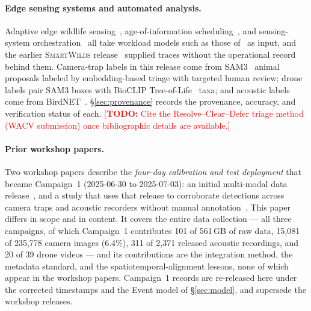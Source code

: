 \documentclass[sigconf]{acmart}
\newcommand{\smartwilds}{\textsc{SmartWilds}\xspace}
\newcommand{\TODO}[1]{\textcolor{red}{\footnotesize[\textbf{TODO:} #1]}}
\newcommand{\TODO}[1]{}
\begin{document}
\paragraph{Edge sensing systems and automated analysis.}
Adaptive edge wildlife
sensing~\cite{rastikerdar2026wildfit,Pestell2025SmartCamera},
age-of-information scheduling~\cite{huang2025ageofevent}, and
sensing-system orchestration~\cite{lin2025skyeye,liu2026eric} all take
workload models such as those of~\cite{kline2024characterizing,kline2026blueprint}
as input, and the earlier \smartwilds
release~\cite{kline2025smartwilds} supplied traces without the
operational record behind them. Camera-trap labels in this release come
from SAM3~\cite{carion2026sam} animal proposals labeled by
embedding-based triage with targeted human review; drone labels pair
SAM3 boxes with BioCLIP
Tree-of-Life~\cite{stevens2024bioclip,gu2025bioclip,treeoflife_200m}
taxa; and acoustic labels come from
BirdNET~\cite{kahl2021birdnet,Besson2022Automated}.
\S\ref{sec:provenance} records the provenance, accuracy, and
verification status of each.
\TODO{Cite the Resolve--Clear--Defer triage method (WACV submission)
once bibliographic details are available.}

\paragraph{Prior workshop papers.}
Two workshop papers describe the \emph{four-day calibration and test
deployment} that became Campaign~1 (2025-06-30 to 2025-07-03): an
initial multi-modal data release~\cite{kline2025smartwilds}, and a
study that uses that release to corroborate detections across camera
traps and acoustic recorders without manual
annotation~\cite{pillai2026cross}.
This paper differs in scope and in content. It covers the entire data
collection --- all three campaigns, of which Campaign~1 contributes
101 of 561\,GB of raw data, 15{,}081 of 235{,}778 camera images (6.4\%),
311 of 2{,}371 released acoustic recordings, and 20 of 39 drone videos
--- and its contributions are the integration method, the metadata
standard, and the spatiotemporal-alignment lessons, none of which appear
in the workshop papers. Campaign~1 records are re-released here under
the corrected timestamps and the Event model of \S\ref{sec:model}, and
supersede the workshop releases.
\end{document}
